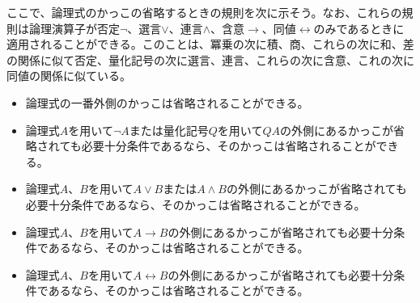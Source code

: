 \documentclass[a4paper]{jsarticle}
\begin{document}
\begin{dfn}
ここで、論理式のかっこの省略するときの規則を次に示そう。なお、これらの規則は論理演算子が否定$\neg$、選言$\vee$、連言$\land$、含意$\rightarrow$、同値$\leftrightarrow$のみであるときに適用されることができる。このことは、冪乗の次に積、商、これらの次に和、差の関係に似て否定、量化記号の次に選言、連言、これらの次に含意、これの次に同値の関係に似ている。
\begin{itemize}
\item
  論理式の一番外側のかっこは省略されることができる。
\item
  論理式$A$を用いて$\neg A$または量化記号$Q$を用いて$QA$の外側にあるかっこが省略されても必要十分条件であるなら、そのかっこは省略されることができる。
\item
  論理式$A$、$B$を用いて$A \vee B$または$A \land B$の外側にあるかっこが省略されても必要十分条件であるなら、そのかっこは省略されることができる。
\item
  論理式$A$、$B$を用いて$A \rightarrow B$の外側にあるかっこが省略されても必要十分条件であるなら、そのかっこは省略されることができる。
\item
  論理式$A$、$B$を用いて$A \leftrightarrow B$の外側にあるかっこが省略されても必要十分条件であるなら、そのかっこは省略されることができる。
\end{itemize}
\end{dfn}
\end{document}
